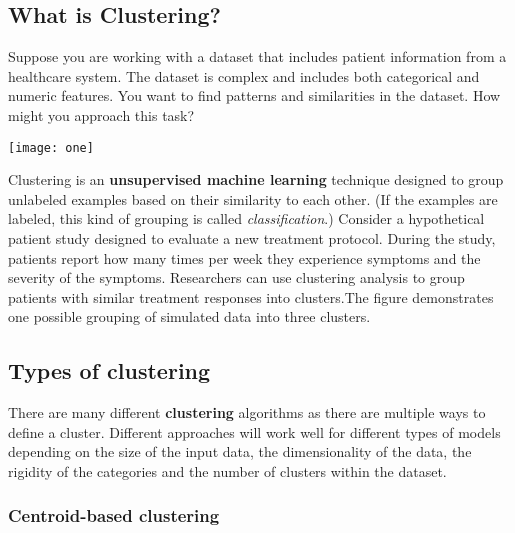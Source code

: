 \subsection{What is Clustering?}
\date{}


\maketitle

Suppose you are working with a dataset that includes patient information from a healthcare system. The dataset is complex and includes both categorical and numeric features. You want to find patterns and similarities in the dataset. How might you approach this task?

\begin{center}
	\texttt{[image: one]}  %
\end{center}




\par Clustering is an \textbf{unsupervised machine learning} technique designed to group unlabeled examples based on their similarity to each other. (If the examples are labeled, this kind of grouping is called \emph{classification}.) Consider a hypothetical patient study designed to evaluate a new treatment protocol. During the study, patients report how many times per week they experience symptoms and the severity of the symptoms. Researchers can use clustering analysis to group patients with similar treatment responses into clusters.The figure demonstrates one possible grouping of simulated data into three clusters.

\subsection{Types of clustering}

\par There are many different \textbf{clustering} algorithms as there are multiple ways to define a cluster. Different approaches will work well for different types of models depending on the size of the input data, the dimensionality of the data, the rigidity of the categories and the number of clusters within the dataset.
\subsubsection{Centroid-based clustering}

